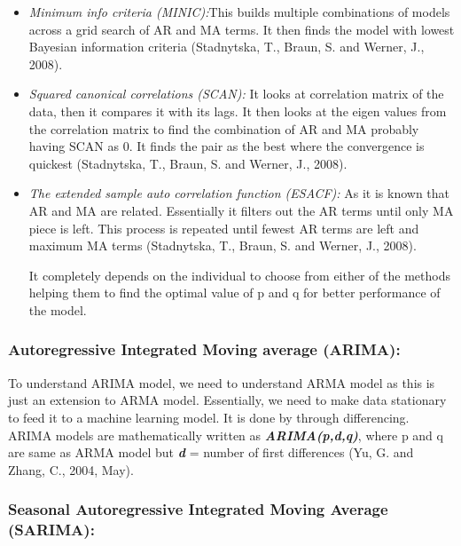\documentclass[
  onepage,
  openany]{scrbook}
\begin{document}
\begin{itemize}
\item
  \emph{Minimum info criteria (MINIC):}This builds multiple combinations
  of models across a grid search of AR and MA terms. It then finds the
  model with lowest Bayesian information criteria (Stadnytska, T.,
  Braun, S. and Werner, J., 2008).
\item
  \emph{Squared canonical correlations (SCAN):} It looks at correlation
  matrix of the data, then it compares it with its lags. It then looks
  at the eigen values from the correlation matrix to find the
  combination of AR and MA probably having SCAN as 0. It finds the pair
  as the best where the convergence is quickest (Stadnytska, T., Braun,
  S. and Werner, J., 2008).
\item
  \emph{The extended sample auto correlation function (ESACF):} As it is
  known that AR and MA are related. Essentially it filters out the AR
  terms until only MA piece is left. This process is repeated until
  fewest AR terms are left and maximum MA terms (Stadnytska, T., Braun,
  S. and Werner, J., 2008).

  It completely depends on the individual to choose from either of the
  methods helping them to find the optimal value of p and q for better
  performance of the model.
\end{itemize}

\hypertarget{autoregressive-integrated-moving-average-arima}{%
\subsubsection{\texorpdfstring{\textbf{Autoregressive Integrated Moving
average
(ARIMA):}}{Autoregressive Integrated Moving average (ARIMA):}}\label{autoregressive-integrated-moving-average-arima}}

To understand ARIMA model, we need to understand ARMA model as this is
just an extension to ARMA model. Essentially, we need to make data
stationary to feed it to a machine learning model. It is done by through
differencing. ARIMA models are mathematically written as
\textbf{\emph{ARIMA(p,d,q)}}, where p and q are same as ARMA model but
\textbf{\emph{d}} = number of first differences (Yu, G. and Zhang, C.,
2004, May).

\hypertarget{seasonal-autoregressive-integrated-moving-average-sarima}{%
\subsubsection{\texorpdfstring{\textbf{Seasonal Autoregressive
Integrated Moving Average
(SARIMA):}}{Seasonal Autoregressive Integrated Moving Average (SARIMA):}}\label{seasonal-autoregressive-integrated-moving-average-sarima}}
\end{document}
